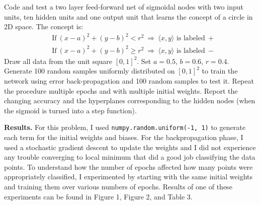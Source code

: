 \documentclass[8pt]{article}
\theoremstyle{definition}
\newenvironment{exercise}[1]
  {\renewcommand\theinnerexercise{#1}\innerexercise}
  {\endinnerexercise}
\begin{document}
\justify
\begin{exercise}{2}
Code and test a two layer feed-forward net of sigmoidal nodes with two input units, ten hidden units and one output unit that learns the concept of a circle in 2D space. The concept is:
\begin{align*}
&\text{If} \ (x - a)^2 + (y - b)^2 < r^2 \ \Longrightarrow \ \langle x, y \rangle \text{ is labeled} \ +\\ 
&\text{If} \ (x - a)^2 + (y - b)^2 \geq r^2 \ \Longrightarrow \ \langle x, y \rangle \text{ is labeled} \ -
\end{align*}
Draw all data from the unit square $[0, 1]^2$. Set $a = 0.5$, $b = 0.6$, $r = 0.4$. Generate 100 random samples uniformly distributed on $[0, 1]^2$ to train the network using
error back-propagation and 100 random samples to test it. Repeat the procedure multiple
epochs and with multiple initial weights. Report the changing accuracy and the hyperplanes
corresponding to the hidden nodes (when the sigmoid is turned into a step function).\\
\end{exercise}

\noindent \textbf{Results.} For this problem, I used \texttt{numpy.random.uniform(-1, 1)} to generate each term for the initial weights and biases. For the backpropagation phase, I used a stochastic gradient descent to update the weights and I did not experience any trouble converging to local minimum that did a good job classifying the data points. To understand how the number of epochs affected how many points were appropriately classified, I experimented by starting with the same initial weights and training them over various numbers of epochs. Results of one of these experiments can be found in Figure 1, Figure 2, and Table 3. 
\end{document}
